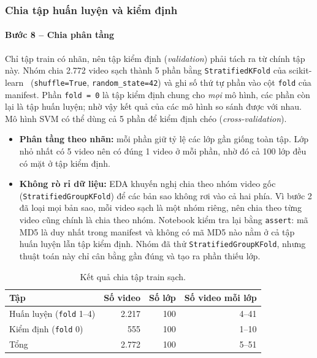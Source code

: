 \subsubsection{Chia tập huấn luyện và kiểm định}
\label{subsec:pp_split}

\paragraph{Bước 8 -- Chia phân tầng} Chỉ tập train có nhãn, nên tập kiểm định (\textit{validation}) phải tách ra từ chính tập này. Nhóm chia 2.772 video sạch thành 5 phần bằng \texttt{StratifiedKFold} của scikit-learn~\cite{sklearn} (\texttt{shuffle=True}, \texttt{random\_state=42}) và ghi số thứ tự phần vào cột \texttt{fold} của manifest. Phần \texttt{fold = 0} là tập kiểm định chung cho \emph{mọi} mô hình, các phần còn lại là tập huấn luyện; nhờ vậy kết quả của các mô hình so sánh được với nhau. Mô hình SVM có thể dùng cả 5 phần để kiểm định chéo (\textit{cross-validation}).

\begin{itemize}
  \item \textbf{Phân tầng theo nhãn:} mỗi phần giữ tỷ lệ các lớp gần giống toàn tập. Lớp nhỏ nhất có 5 video nên có đúng 1 video ở mỗi phần, nhờ đó cả 100 lớp đều có mặt ở tập kiểm định.
  \item \textbf{Không rò rỉ dữ liệu:} EDA khuyến nghị chia theo nhóm video gốc (\texttt{StratifiedGroupKFold}) để các bản sao không rơi vào cả hai phía. Vì bước 2 đã loại mọi bản sao, mỗi video sạch là một nhóm riêng, nên chia theo từng video cũng chính là chia theo nhóm. Notebook kiểm tra lại bằng \texttt{assert}: mã MD5 là duy nhất trong manifest và không có mã MD5 nào nằm ở cả tập huấn luyện lẫn tập kiểm định. Nhóm đã thử \texttt{StratifiedGroupKFold}, nhưng thuật toán này chỉ cân bằng gần đúng và tạo ra phần thiếu lớp.
\end{itemize}

\begin{table}[H]
  \centering
  \caption{Kết quả chia tập train sạch.}
  \label{tab:pp_split}
  \small
  \begin{tabular}{@{}lrrr@{}}
    \toprule
    \textbf{Tập} & \textbf{Số video} & \textbf{Số lớp} & \textbf{Số video mỗi lớp} \\
    \midrule
    Huấn luyện (\texttt{fold} 1--4) & 2.217 & 100 & 4--41 \\
    Kiểm định (\texttt{fold} 0)     & 555   & 100 & 1--10 \\
    \midrule
    Tổng                            & 2.772 & 100 & 5--51 \\
    \bottomrule
  \end{tabular}
\end{table}

